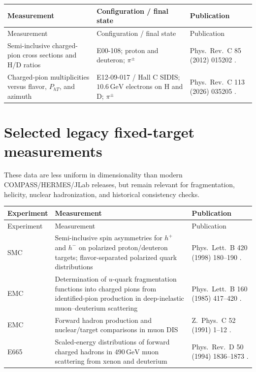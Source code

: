 \documentclass[11pt]{article}
\newcommand{\pt}{P_{hT}}
\newcommand{\GeV}{\mathrm{GeV}}
\begin{document}
\small
\begin{longtable}{@{}p{}p{}p{}@{}}
\toprule
Measurement & Configuration / final state & Publication \\ \midrule
\endfirsthead
\toprule
Measurement & Configuration / final state & Publication \\ \midrule
\endhead
Semi-inclusive charged-pion cross sections and H/D ratios &
E00-108; proton and deuteron; $\pi^\pm$ &
Phys.\ Rev.\ C 85 (2012) 015202 \cite{JLABC:E00108}. \\

Charged-pion multiplicities versus flavor, $\pt$, and azimuth &
E12-09-017 / Hall C SIDIS; $10.6\,\GeV$ electrons on H and D; $\pi^\pm$ &
Phys.\ Rev.\ C 113 (2026) 035205 \cite{JLABC:mult2026}. \\
\bottomrule
\end{longtable}
\normalsize

\section{Selected legacy fixed-target measurements}

These data are less uniform in dimensionality than modern COMPASS/HERMES/JLab releases, but remain
relevant for fragmentation, helicity, nuclear hadronization, and historical consistency checks.

\small
\begin{longtable}{@{}p{}p{}p{}@{}}
\toprule
Experiment & Measurement & Publication \\ \midrule
\endfirsthead
\toprule
Experiment & Measurement & Publication \\ \midrule
\endhead
SMC &
Semi-inclusive spin asymmetries for $h^+$ and $h^-$ on polarized proton/deuteron targets;
flavor-separated polarized quark distributions &
Phys.\ Lett.\ B 420 (1998) 180--190 \cite{SMC:semi1998}. \\

EMC &
Determination of $u$-quark fragmentation functions into charged pions from identified-pion
production in deep-inelastic muon--deuterium scattering &
Phys.\ Lett.\ B 160 (1985) 417--420 \cite{EMC:pionFF1985}. \\

EMC &
Forward hadron production and nuclear/target comparisons in muon DIS &
Z.\ Phys.\ C 52 (1991) 1--12 \cite{EMC:nuclear1991}. \\

E665 &
Scaled-energy distributions of forward charged hadrons in $490\,\GeV$ muon scattering from
xenon and deuterium &
Phys.\ Rev.\ D 50 (1994) 1836--1873 \cite{E665:z1994}. \\
\bottomrule
\end{longtable}
\normalsize
\end{document}
